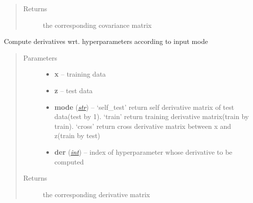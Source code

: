 \documentclass[letterpaper,10pt,english]{sphinxmanual}
\begin{document}
\begin{fulllineitems}
\begin{fulllineitems}
\begin{quote}
\begin{description}
\item[{Returns}] \leavevmode
the corresponding covariance matrix

\end{description}\end{quote}

\end{fulllineitems}


\begin{fulllineitems}
\label{pyGPs.Core:pyGPs.Core.cov.Kernel.getDerMatrix}
Compute derivatives wrt. hyperparameters according to input mode
\begin{quote}\begin{description}
\item[{Parameters}] \leavevmode\begin{itemize}
\item {} 
\textbf{x} -- training data

\item {} 
\textbf{z} -- test data

\item {} 
\textbf{mode} (\href{http://docs.python.org/library/functions.html\#str}{\emph{str}}) -- `self\_test' return self derivative matrix of test data(test by 1). 
`train' return training derivative matrix(train by train).
`cross' return cross derivative matrix between x and z(train by test)

\item {} 
\textbf{der} (\href{http://docs.python.org/library/functions.html\#int}{\emph{int}}) -- index of hyperparameter whose derivative to be computed

\end{itemize}

\item[{Returns}] \leavevmode
the corresponding derivative matrix

\end{description}\end{quote}

\end{fulllineitems}


\end{fulllineitems}

\end{document}
